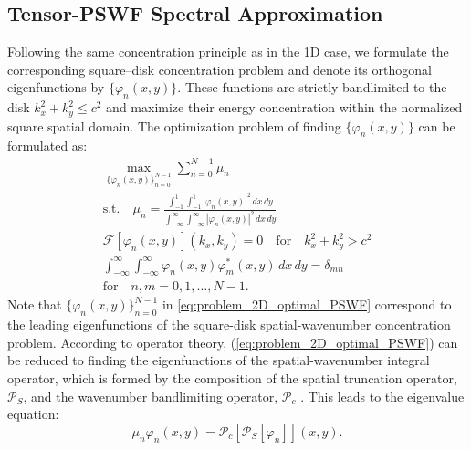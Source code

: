 \documentclass[lettersize,journal]{IEEEtran}
\theoremstyle{plain}
\begin{document}
	
\subsection{Tensor-PSWF Spectral Approximation}
\label{sec:Tensor-PSWF Spectral Approximation}
Following the same concentration principle as in the 1D case, we formulate the corresponding square--disk concentration problem and denote its orthogonal eigenfunctions by $\{\varphi_n(x, y)\}$. These functions are strictly bandlimited to the disk $k_x^2 + k_y^2 \leq c^2$ and maximize their energy concentration within the normalized square spatial domain.
The optimization problem of finding $\{\varphi_n(x, y)\}$ can be formulated as:
\begin{gather}
	\underset{\{\varphi_n(x, y)\}_{n=0}^{N-1}}{\max} \sum_{n=0}^{N-1}\mu_n \nonumber \\
	\text{s.t.} \quad \mu_n = \frac{\int_{-1}^{1}\int_{-1}^{1}|\varphi_n(x, y)|^2\,dx\,dy}{\int_{-\infty}^{\infty}\int_{-\infty}^{\infty}|\varphi_n(x, y)|^2\,dx\,dy} \nonumber \\
	\mathcal{F}[\varphi_n(x,y)](k_x, k_y) = 0 \quad \text{for} \quad k_x^2 + k_y^2 > c^2 \nonumber \\
	\int_{-\infty}^{\infty}\int_{-\infty}^{\infty}\varphi_n(x, y)\varphi_m^*(x, y)\,dx\,dy = \delta_{mn} \nonumber \\
	\text{for}\quad n,m = 0, 1, \ldots, N-1.
	\label{eq:problem_2D_optimal_PSWF} 
\end{gather}
Note that $\{\varphi_n(x, y)\}_{n=0}^{N-1}$ in \eqref{eq:problem_2D_optimal_PSWF} correspond to the leading eigenfunctions of the square-disk spatial-wavenumber concentration problem.
According to operator theory, (\ref{eq:problem_2D_optimal_PSWF}) can be reduced to finding the eigenfunctions of the spatial-wavenumber integral operator, which is formed by the composition of the spatial truncation operator, $\mathcal{P}_S$, and the wavenumber bandlimiting operator, $\mathcal{P}_c$ \cite{simons2010slepian, Slepian1964Prolate}. This leads to the eigenvalue equation:
$$
	\mu_n\varphi_n(x, y) = \mathcal{P}_c[\mathcal{P}_S[\varphi_n]](x, y).
	\label{eq:eigensystem_operator}
$$
	
\end{document}
